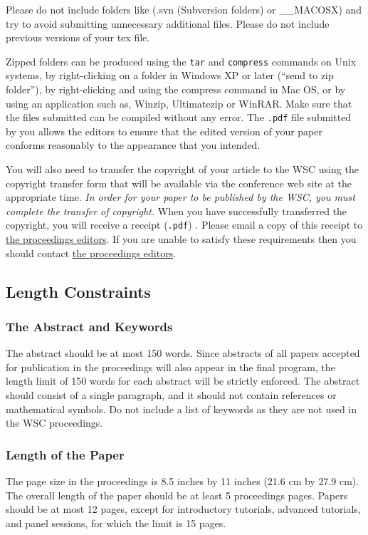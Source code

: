 \documentclass{wscpaperproc}
\theoremstyle{wsc}
\begin{document}
Please do not include folders like (.svn (Subversion folders) or \_\_MACOSX) and try to avoid submitting unnecessary additional files.
Please do not include previous versions of your tex file.

Zipped folders can be
produced using the {\tt tar} and {\tt compress} commands on Unix systems, by right-clicking on
a folder in Windows XP or later (``send to zip folder''), by right-clicking and using the compress command in Mac OS, or by using an application such as,
Winzip, Ultimatezip or WinRAR.
Make sure that the files submitted can be compiled without any error.
The {\tt .pdf} file submitted by you allows the editors to ensure that the edited version of your paper conforms reasonably to the appearance
that you intended.

You will also need to transfer the copyright of your article to the WSC using the copyright transfer form that will be available via the conference web site at the appropriate time. {\em In order for your paper to be published by the WSC, you must complete the transfer of copyright.}
When you have successfully transferred the copyright, you will receive a receipt ({\tt .pdf}) .
Please email a copy of this receipt to \href{mailto://wsc15proceedings@gmail.com}{the proceedings editors}. If you are unable to satisfy these requirements then you should contact \href{mailto://wsc15proceedings@gmail.com}{the proceedings editors}.

\subsection{Length Constraints}

\subsubsection{The Abstract and Keywords}
The abstract should be at most 150 words. Since abstracts of all papers accepted for publication in the proceedings will also appear in the final program, the length limit of 150 words for each abstract will be strictly enforced. The abstract should consist of a single paragraph, and it should not
contain references or mathematical symbols. Do not include a list of keywords as they are not used in the WSC proceedings.

\subsubsection{Length of the Paper}
The page size in the proceedings is 8.5 inches by 11 inches (21.6 cm by 27.9 cm). The overall length of the paper should be at least 5 proceedings pages. Papers should be at most 12 pages, except for introductory tutorials, advanced tutorials, and panel sessions, for which the limit is 15 pages.
\end{document}
